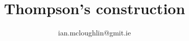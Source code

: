 \documentclass[dvipsnames,hidelinks,t]{beamer}
\begin{document}
    \title{Thompson's construction}
    \subtitle{}
    \author{ian.mcloughlin@gmit.ie}
    \date{}
  
    \begin{frame}
      \titlepage
    \end{frame}
  
     
  
\end{document}
